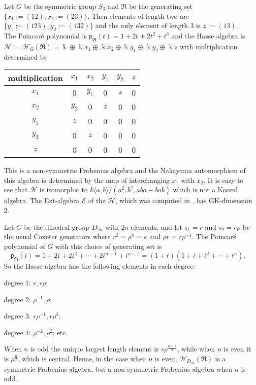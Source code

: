 \begin{example}
\label{xxex2.6} 
Let $G$ be the symmetric group $S_3$ and $\Re$ be the generating set 
$\{x_1:=(12), x_2:=(23)\}$. 
Then elements of length two are $\{y_1:=(123), y_2:=(132)\}$
and the only element of length 3 is $z:=(13)$. The Poincar{\'e} 
polynomial is ${\mathfrak{p}}_\Re(t)=1+2t+2t^2+t^3$ and the Hasse algebra 
is ${\mathcal H}:={\mathcal H}_G(\Re)=\Bbbk  \oplus  \Bbbk  x_1
\oplus \Bbbk  x_2\oplus \Bbbk  y_1\oplus \Bbbk  y_2\oplus \Bbbk  z$ 
with multiplication determined by

\begin{center}
\begin{tabular}{|c|c|c|c|c|c|}\hline
multiplication & $x_1$ & $x_2$ & $y_1$ & $y_2$ & $z$ 
\\ \hline
$x_1$ &  0 & $y_1$ &  0   & $z$ & 0 \\ \hline
$x_2$ &  $y_2$ & 0 &  $z$ & 0   & 0\\ \hline
$y_1$ &  $z$    & 0  &  0& 0& 0\\ \hline
$y_2$ &  0      & $z$    &  0& 0& 0\\ \hline
$z$ &  0 &0  &0  &0    &0 \\ \hline
\end{tabular}
\end{center}

This is a non-symmetric Frobenius algebra and the Nakayama
automorphism of this algebra is determined by the map of interchanging $x_1$ 
with $x_2$. It is easy to see that 
${\mathcal H}$ is isomorphic to $k\langle a,b\rangle
/(a^2, b^2, aba-bab)$ which is not a Koszul algebra. 
The Ext-algebra ${\mathcal E}$ of the ${\mathcal H}$, which 
was computed in \cite[Theorem 3.3]{SV}, has 
GK-dimension 2.
\end{example}

\begin{example}
\label{xxex2.7}
Let $G$ be the dihedral group $D_{2n}$ with $2n$ elements, and let 
$s_1 = r$ and $s_2 = r\rho$ be the usual Coxeter generators where $r^2 = \rho^n = e$ and $\rho r = r \rho^{-1}$. 
The Poincar{\'e} polynomial of $G$ with this choice of generating set is
$${\mathfrak{p}}_\Re(t)=1+2t+2t^2+\cdots+ 2t^{n-1}+t^{n-1}= (1+t)(1+t+t^2+\cdots + t^{n}).$$
So the Hasse algebra has the following elements in each degree:

degree 1: $r, r\rho$;

degree 2: $\rho^{-1}, \rho$;

degree 3: $r\rho^{-1}, r\rho^2$;

degree 4: $\rho^{-2}, \rho^2$; etc.

When $n$ is odd the unique largest length element is $r\rho^{\frac{n+1}{2}}$,
while  when $n$ is even it is $\rho^{\frac{n}{2}}$, which is central.
Hence, in the case when $n$ is even, ${\mathcal H}_{D_{2n}}(\Re)$ is a symmetric 
Frobenius algebra, but a non-symmetric 
Frobenius algebra when $n$ is odd.
\end{example}

